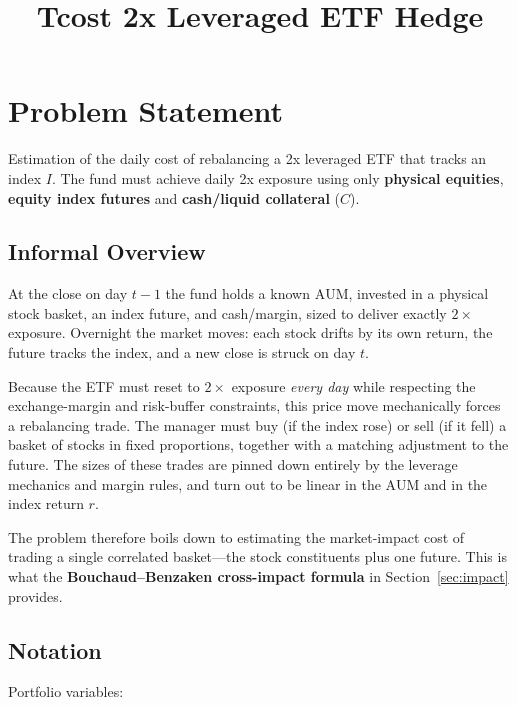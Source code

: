 \documentclass[11pt]{article}
\title{Tcost 2x Leveraged ETF Hedge}
\author{}
\date{}
\begin{document}
\maketitle

\section{Problem Statement}

Estimation of the daily cost of rebalancing a 2x leveraged ETF that tracks an index $I$. The fund must achieve daily 2x exposure using only \textbf{physical equities}, 
\textbf{equity index futures} and \textbf{cash/liquid collateral} ($C$).

\subsection{Informal Overview}

At the close on day $t-1$ the fund holds a known $\mathrm{AUM}$, invested in a
physical stock basket, an index future, and cash/margin, sized to deliver
exactly $2\times$ exposure. Overnight the market moves: each stock drifts by its
own return, the future tracks the index, and a new close is struck on day $t$.

Because the ETF must reset to $2\times$ exposure \emph{every day} while respecting
the exchange-margin and risk-buffer constraints, this price move mechanically
forces a rebalancing trade. The manager must buy (if the index rose) or sell (if
it fell) a basket of stocks in fixed proportions, together with a matching
adjustment to the future. The sizes of these trades are pinned down entirely by
the leverage mechanics and margin rules, and turn out to be linear in the
$\mathrm{AUM}$ and in the index return $r$.

The problem therefore boils down to estimating the market-impact cost of trading
a single correlated basket---the stock constituents plus one future. This is
what the \textbf{Bouchaud--Benzaken cross-impact formula} in
Section~\ref{sec:impact} provides.

\subsection{Notation}

Portfolio variables:
\end{document}
